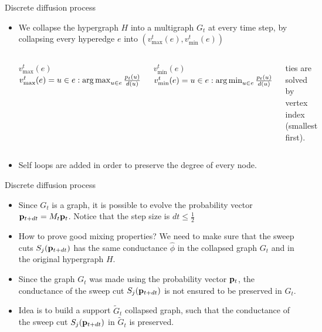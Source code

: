 \documentclass[../main.tex]{subfiles}
\begin{document}
	\begin{frame}{Discrete diffusion process}
		\begin{itemize}
			\item We collapse the hypergraph $H$ into a multigraph $G_t$ at every time step, by collapsing every hyperedge $e$ into $(v_{\text{max}}^t(e), v_{\text{min}}^t(e))$
				\begin{columns}
					\begin{block}{$v_{\text{max}}^t(e)$}
						$v_{\text{max}}^t(e) = u\in e : \operatorname*{arg\,max}_{u\in e} \frac{p_t(u)}{d(u)}$
					\end{block}
					\begin{block}{$v_{\text{min}}^t(e)$}
						$v_{\text{min}}^t(e) = u\in e : \operatorname*{arg\,min}_{u\in e} \frac{p_t(u)}{d(u)}$
					\end{block}
					ties are solved by vertex index (smallest first).
				\end{columns}
			\item Self loops are added in order to preserve the degree of every node.
		\end{itemize}
	\end{frame}

	\begin{frame}{Discrete diffusion process}
		\begin{itemize}
			\item Since $G_t$ is a graph, it is possible to evolve the probability vector $\bold{p}_{t+dt} = M_t \bold{p}_t$. Notice that the step size is $dt\leq \frac{1}{2}$
			\item How to prove good mixing properties? We need to make sure that the sweep cuts $S_j(\bold{p}_{t+dt})$ has the same conductance $\hat{\phi}$ in the collapsed graph $G_t$ and in the original hypergraph $H$.
			\item Since the graph $G_t$ was made using the probability vector $\bold{p}_{t}$, the conductance of the sweep cut $S_j(\bold{p}_{t+dt})$ is not ensured to be preserved in $G_t$.
			\item Idea is to build a support $\tilde{G}_t$ collapsed graph, such that the conductance of the sweep cut $S_j(\bold{p}_{t+dt})$ in $\tilde{G}_t$ is preserved.
		\end{itemize}
	\end{frame}
\end{document}

